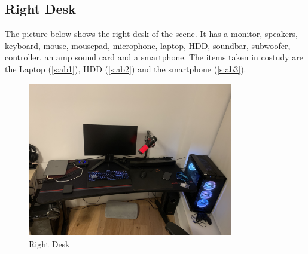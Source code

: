 \subsection{Right Desk}
\label{s:right-desk}
The picture below shows the right desk of the scene. It has a monitor, speakers,
keyboard, mouse, mousepad, microphone, laptop, HDD, soundbar, subwoofer,
controller, an amp sound card and a smartphone. The items taken in costudy are
the Laptop (\ref{s:ab1}), HDD (\ref{s:ab2}) and the smartphone (\ref{s:ab3}).
\begin{figure}[h]
  \centering
  \includegraphics[width=0.8\textwidth]{figures/pictures/IMG_5038.JPG}
  \caption{Right Desk}
  \label{fig:right-desk}
\end{figure}
\newpage

